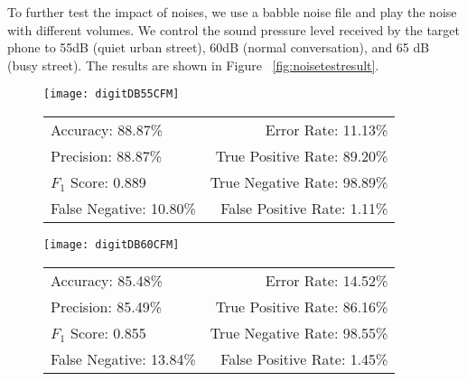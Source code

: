 To further test the impact of noises, we use a babble noise file and play the noise with different volumes. We control the sound pressure level received by the target phone to 55dB (quiet urban street), 60dB (normal conversation), and 65 dB (busy street). The results are shown in Figure ~\ref{fig:noisetestresult}.

\begin{landscape}
	\begin{figure}[!h]
		
		\begin{minipage}[c]{.33\linewidth}
			\centering
			\texttt{[image: digitDB55CFM]}
			\tiny
			\begin{tabular}{lr}
				\toprule
				Accuracy: 88.87\% & \hspace{-.00in} Error Rate: 11.13\% \\
				Precision: 88.87\% & \hspace{-.00in} True Positive Rate: 89.20\% \\
				$F_1$ Score: 0.889 & \hspace{-.00in} True Negative Rate: 98.89\% \\
				False Negative: 10.80\% & \hspace{-.00in} False Positive Rate: 1.11\% \\
				\bottomrule
			\end{tabular}
		\end{minipage}
		\begin{minipage}[c]{.33\linewidth}
			\centering
			\texttt{[image: digitDB60CFM]}
			\tiny
			\begin{tabular}{lr}
				\toprule
				Accuracy: 85.48\% & \hspace{-.00in} Error Rate: 14.52\% \\
				Precision: 85.49\% & \hspace{-.00in} True Positive Rate: 86.16\% \\
				$F_1$ Score: 0.855 & \hspace{-.00in} True Negative Rate: 98.55\% \\
				False Negative: 13.84\% & \hspace{-.00in} False Positive Rate: 1.45\% \\
				\bottomrule
			\end{tabular}
		\end{minipage}
		\begin{minipage}[c]{.33\linewidth}

\end{minipage}
\end{figure}
\end{landscape}
